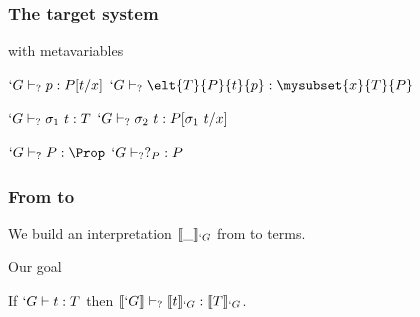 \begin{frame}
  \frametitle{The target system}
  
  \begin{block}{\CIC{} with metavariables}
    \begin{center}
      {$`G \vdash_{?} p : P[t/x]$}
      {$`G \typec \elt{T}{P}{t}{p} : \mysubset{x}{T}{P}$}
      {}\DP
      
      \vspace{0.25cm}
      {$`G \vdash_{?} \sigma_1~t : T$}
      {}
      \DP
      \quad
      {$`G \vdash_{?} \sigma_2~t : P[\sigma_1~t/x]$}
      {}
      \DP

      \vspace{0.25cm}
      \UAX{}
      {$`G \typec P : \Prop$}
      {$`G \vdash_{?} ?_{P} : P$}
      {}\DP
    \end{center}
  \end{block}
    
\end{frame}
\begin{frame}
  \frametitle{From \lng{} to \Coq}

  
  We build an interpretation $\llbracket \_ \rrbracket_{`G}$ from \Russell to \CICq
  terms.
  
  \begin{block}{Our goal}
    \begin{center}
      If $`G \vdash t : T$ then $\llbracket `G \rrbracket \vdash_{?} \llbracket t \rrbracket_{`G} : \llbracket T \rrbracket_{`G}$.
    \end{center}
  \end{block}
\end{frame}

